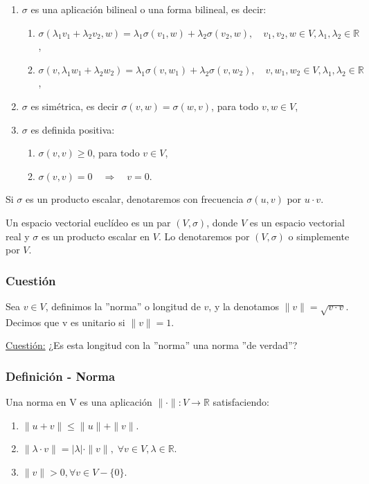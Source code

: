 \documentclass[12pt, a4paper, ones, notitlepage, openany,titlepage]{article}
\begin{document}
\begin{enumerate}[label=(\arabic*)]
	
	\item $\sigma$ es una aplicación bilineal o una forma bilineal, es decir:
	\begin{enumerate}[label=(\alph*)]
		\item $\sigma\left(\lambda_{1} v_{1}+\lambda_{2} v_{2}, w\right)=\lambda_{1} \sigma\left(v_{1}, w\right)+\lambda_{2} \sigma\left(v_{2}, w\right), \quad v_{1}, v_{2}, w \in V, \lambda_{1}, \lambda_{2} \in \mathbb{R}$,
		\item $\sigma\left(v, \lambda_{1} w_{1}+\lambda_{2} w_{2}\right)=\lambda_{1} \sigma\left(v, w_{1}\right)+\lambda_{2} \sigma\left(v, w_{2}\right), \quad v, w_{1}, w_{2} \in V, \lambda_{1}, \lambda_{2} \in \mathbb{R}$,
	\end{enumerate}
	\item $\sigma$ es simétrica, es decir $\sigma(v, w)=\sigma(w, v)$, para todo $v, w \in V$,
	
	\item $\sigma$ es definida positiva:
	
	\begin{enumerate}[label=(\alph*)]
		\item $\sigma(v, v) \geq 0$, para todo $v \in V$,
		
		\item $\sigma(v, v)=0 \quad \Rightarrow \quad v=0$.
	\end{enumerate}
\end{enumerate}
Si $\sigma$ es un producto escalar, denotaremos con frecuencia $\sigma(u, v)$ por $u \cdot v$.

Un espacio vectorial euclídeo es un par $(V, \sigma)$, donde $V$ es un espacio vectorial real y $\sigma$ es un producto escalar en $V$. Lo denotaremos por $(V, \sigma)$ o simplemente por $V$.

\subsubsection{Cuestión}
Sea $v \in V$, definimos la ''norma'' o longitud de $v$, y la denotamos $\|v\| = \sqrt{v \cdot v}$. Decimos que v es unitario si $\|v\| = 1$.

\underline{Cuestión:}
¿Es esta longitud con la ''norma'' una norma ''de verdad''?

\subsubsection{Definición - Norma}
\noindent Una norma en V es una aplicación $\|\cdot\| : V \longrightarrow \mathbb{R}$ satisfaciendo:
\begin{enumerate}
	\item $\|u + v \| \le \|u\| + \|v\|$.
	\item $\|\lambda \cdot v\| = |\lambda| \cdot \|v\|, \; \forall v \in V, \lambda \in \mathbb{R}$.
	\item $\|v\| > 0, \forall v \in V - \{0\}$.
\end{enumerate}
\end{document}

